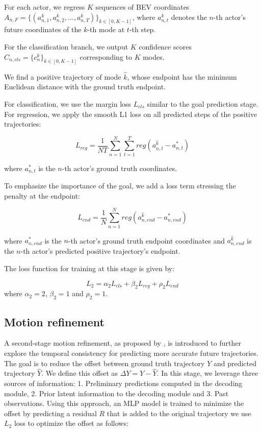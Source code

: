 For each actor, we regress $K$ sequences of BEV coordinates 
$A_{n,F}=\{(a_{n,1}^k,a_{n,2}^k,...,a_{n,T}^k)\}_{k \in [0,K-1]}$,
where $a_{n,t}^k$ denotes the $n$-th actor's future coordinates of the $k$-th mode at $t$-th step. 

For the classification branch, we output $K$ confidence scores $    C_{n,cls} = \{c_n^k\}_{k \in [0,K-1]}
$ corresponding to $K$ modes.

We find a positive trajectory of mode $\hat{k}$, whose endpoint has the minimum Euclidean distance with the ground truth endpoint.

For classification, we use the margin loss  $L_{cls}$ similar to the goal prediction stage. 
For regression, we apply the smooth L1 loss on all predicted steps of the positive trajectories:

\begin{equation}
	L_{reg}=\frac{1}{NT}\sum_{n=1}^N\sum_{t=1}^T{reg(a_{n,t}^{\hat{k}}-a^{*}_{n,t})}
\end{equation}

where $a^{*}_{n,t}$ is the $n$-th actor's ground truth coordinates.

To emphasize the importance of the goal, we add a loss term stressing the penalty at the endpoint:

\begin{equation}
	L_{end}=\frac{1}{N}\sum_{n=1}^N{reg(a_{n,end}^{\hat{k}}-a^{*}_{n,end})}
\end{equation}

where $a^{*}_{n,end}$ is the $n$-th actor's ground truth endpoint coordinates and $a_{n,end}^{\hat{k}}$ is the $n$-th actor's predicted positive trajectory's endpoint.

The loss function for training at this stage is given by:

\begin{equation}
	L_{2} = \alpha_2 L_{cls} + \beta_2 L_{reg} + \rho_2 L_{end}
\end{equation}
where $\alpha_2=2$, $\beta_2=1$ and $\rho_2=1$.

\subsection{Motion refinement}
\label{subsec:refinement}

A second-stage motion refinement, as proposed by \cite{liu2023laformer}, is introduced to further explore the temporal consistency for predicting more accurate future trajectories. The goal is to reduce the offset between ground truth trajectory $Y$ and predicted trajectory $\hat{Y}$. We define this offset as $\Delta{Y} = Y - \hat{Y}$. In this stage, we leverage three sources of information: 1. Preliminary predictions computed in the decoding module, 2. Prior latent information to the decoding module and 3. Past observations. Using this approach, an MLP model is trained to minimize the offset by predicting a residual $R$ that is added to the original trajectory \ie we use $L_2$ loss to optimize the offset as follows:

